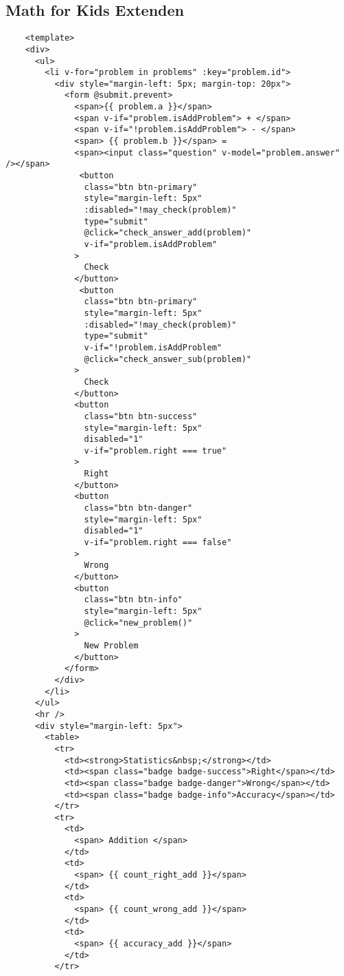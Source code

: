 \subsection{Math for Kids Extenden}
\label{appendix:math_kids_extended_source_code}
\begin{lstlisting}
    <template>
    <div>
      <ul>
        <li v-for="problem in problems" :key="problem.id">
          <div style="margin-left: 5px; margin-top: 20px">
            <form @submit.prevent>
              <span>{{ problem.a }}</span>
              <span v-if="problem.isAddProblem"> + </span>
              <span v-if="!problem.isAddProblem"> - </span>
              <span> {{ problem.b }}</span> =
              <span><input class="question" v-model="problem.answer" /></span>
               <button
                class="btn btn-primary"
                style="margin-left: 5px"
                :disabled="!may_check(problem)"
                type="submit"
                @click="check_answer_add(problem)"
                v-if="problem.isAddProblem"
              >
                Check
              </button>
               <button
                class="btn btn-primary"
                style="margin-left: 5px"
                :disabled="!may_check(problem)"
                type="submit"
                v-if="!problem.isAddProblem"
                @click="check_answer_sub(problem)"
              >
                Check
              </button>
              <button
                class="btn btn-success"
                style="margin-left: 5px"
                disabled="1"
                v-if="problem.right === true"
              >
                Right
              </button>
              <button
                class="btn btn-danger"
                style="margin-left: 5px"
                disabled="1"
                v-if="problem.right === false"
              >
                Wrong
              </button>
              <button
                class="btn btn-info"
                style="margin-left: 5px"
                @click="new_problem()"
              >
                New Problem
              </button>
            </form>
          </div>
        </li>
      </ul>
      <hr />
      <div style="margin-left: 5px">
        <table>
          <tr>
            <td><strong>Statistics&nbsp;</strong></td>
            <td><span class="badge badge-success">Right</span></td>
            <td><span class="badge badge-danger">Wrong</span></td>
            <td><span class="badge badge-info">Accuracy</span></td>
          </tr>
          <tr>
            <td>
              <span> Addition </span>
            </td>
            <td>
              <span> {{ count_right_add }}</span>
            </td>
            <td>
              <span> {{ count_wrong_add }}</span>
            </td>
            <td>
              <span> {{ accuracy_add }}</span>
            </td>
          </tr>
  

\end{lstlisting}

